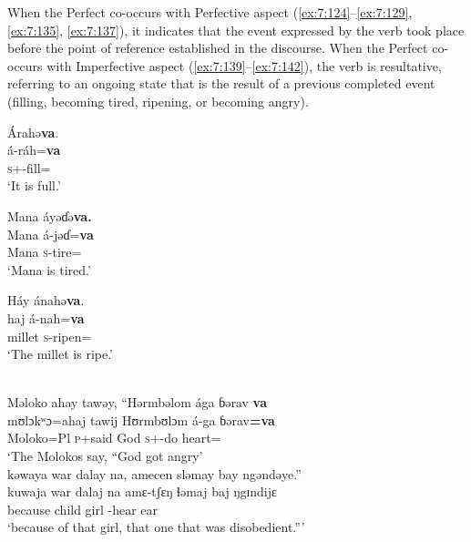 When the Perfect co-occurs with Perfective aspect (\ref{ex:7:124}--\ref{ex:7:129}, \ref{ex:7:135}, \ref{ex:7:137}), it indicates that the event expressed by the verb took place before the point of reference established in the discourse. When the Perfect co-occurs with Imperfective aspect (\ref{ex:7:139}--\ref{ex:7:142}), the verb is resultative, referring to an ongoing state that is the result of a previous completed event (filling, becoming tired, ripening, or becoming angry).

\ea\label{ex:7:139}
Árahə\textbf{va}.\\
\gll  á-ráh=\textbf{va}\\
      \textsc{s}+{\IFV}-fill={\PRF}\\
\glt  ‘It is full.’\\
\z 

\ea\label{ex:7:140}
Mana  áyəɗə\textbf{va.}\\
\gll  Mana      á-jəɗ=\textbf{va}\\
      Mana      \textsc{s}-tire={\PRF}\\
\glt  ‘Mana is tired.’\\
\z 

\ea\label{ex:7:141}
Háy  ánahə\textbf{va}.\\
\gll  haj      á-nah=\textbf{va}\\
      millet  \textsc{s}-ripen={\PRF}\\
\glt  ‘The millet is ripe.’\\
\z 


\ea\label{ex:7:142}\\
Məloko  ahay  tawəy,  “Hərmbəlom  ága  ɓərav \textbf{va}\\ 
\gll  mʊlɔkʷɔ=ahaj  tawij  Hʊrmbʊlɔm    á-ga       ɓərav\textbf{=va} \\  
      Moloko=Pl \textsc{p}+said God \textsc{s}+{\IFV}-do heart={\PRF}\\ 
\glt ‘The Molokos say, “God got angry’\\      
      
      \medskip
      \clearpage
kəwaya  war  dalay  na, amecen  sləmay  bay  ngəndəye.”\\      
\gll kuwaja war dalaj na amɛ-tʃɛŋ ɬəmaj baj ŋgɪndijɛ\\
     because child girl {\PSP} {\DEP}-hear ear {\NEG}  {\DEM}\\
\glt  ‘because of that girl, that one that was disobedient.”’\\
\z 

